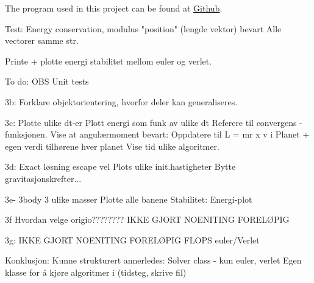 


The program used in this project can be found at \href{https://github.com/kjetka/Project3}{Github}. 




Test: 		Energy conservation, modulus "position" (lengde vektor) bevart
				Alle vectorer samme str.



	Printe + plotte energi stabilitet mellom euler og verlet.


To do:
	OBS Unit tests
	
	3b:
								Forklare objektorientering, hvorfor deler kan generaliseres. 
	
	3c: 					  Plotte ulike dt-er
								Plott energi som funk av ulike dt
								Referere til convergens - funksjonen.
								Vise at angulærmoment bevart:
										Oppdatere til L = mr x v i Planet + egen verdi tilhørene hver planet
								Vise tid ulike algoritmer. 

	3d: 					  Exact løsning escape vel
								Plots ulike init.hastigheter
								Bytte gravitasjonskrefter... 
								
	3e- 3body			3 ulike masser
								Plotte alle banene
								Stabilitet: Energi-plot
	
	3f							Hvordan velge origio????????
								IKKE GJORT NOENITING FORELØPIG
	
	3g:							IKKE GJORT NOENITING FORELØPIG					
	FLOPS euler/Verlet
		

Konklusjon: 
	Kunne strukturert annerledes: 
		Solver class  - kun euler, verlet
		Egen klasse for å kjøre algoritmer i (tidsteg, skrive fil)